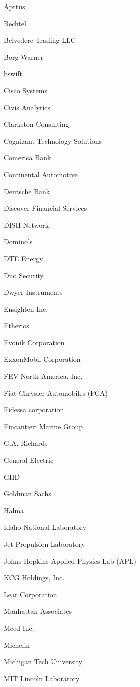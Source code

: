 \documentclass[twoside]{article}
\begin{document}
\begin{center}
\begin{multicols}{5}
\begin{FlushLeft}
\begin{compactitem}
\item Apttus
\item Bechtel
\item Belvedere Trading LLC
\item Borg Warner
\item bswift
\item Cisco Systems
\item Civis Analytics
\item Clarkston Consulting
\item Cognizant Technology Solutions
\item Comerica Bank
\item Continental Automotive
\item Deutsche Bank
\item Discover Financial Services
\item DISH Network
\item Domino's
\item DTE Energy
\item Duo Security
\item Dwyer Instruments
\item Ensighten Inc.
\item Etherios
\item Evonik Corporation
\item ExxonMobil Corporation
\item FEV North America, Inc.
\item Fiat Chrysler Automobiles (FCA)
\item Fidessa corporation
\item Fincantieri Marine Group
\item G.A. Richards
\item General Electric
\item GHD
\item Goldman Sachs
\item Halma
\item Idaho National Laboratory
\item Jet Propulsion Laboratory
\item Johns Hopkins Applied Physics Lab (APL)
\item KCG Holdings, Inc.
\item Lear Corporation
\item Manhattan Associates
\item Meed Inc.
\item Michelin
\item Michigan Tech University
\item MIT Lincoln Laboratory

\end{compactitem}
\end{FlushLeft}
\end{multicols}
\end{center}
\end{document}
